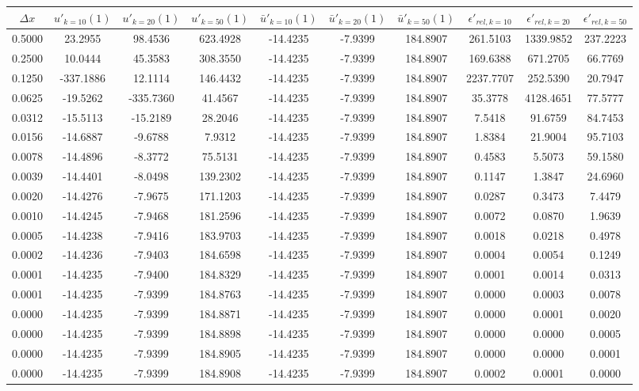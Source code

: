 \begin{tabular}{|c|c|c|c|c|c|c|c|c|c|}
\hline
\textbf{$\Delta x$}&\textbf{$u'_{k=10}(1)$}&\textbf{$u'_{k=20}(1)$}&\textbf{$u'_{k=50}(1)$}&\textbf{$\bar{u}'_{k=10}(1)$}&\textbf{$\bar{u}'_{k=20}(1)$}&\textbf{$\bar{u}'_{k=50}(1)$}&\textbf{$\epsilon'_{rel,k=10}$}&\textbf{$\epsilon'_{rel,k=20}$}&\textbf{$\epsilon'_{rel,k=50}$}\\\hline
0.5000&23.2955&98.4536&623.4928&-14.4235&-7.9399&184.8907&261.5103&1339.9852&237.2223\\\hline
0.2500&10.0444&45.3583&308.3550&-14.4235&-7.9399&184.8907&169.6388&671.2705&66.7769\\\hline
0.1250&-337.1886&12.1114&146.4432&-14.4235&-7.9399&184.8907&2237.7707&252.5390&20.7947\\\hline
0.0625&-19.5262&-335.7360&41.4567&-14.4235&-7.9399&184.8907&35.3778&4128.4651&77.5777\\\hline
0.0312&-15.5113&-15.2189&28.2046&-14.4235&-7.9399&184.8907&7.5418&91.6759&84.7453\\\hline
0.0156&-14.6887&-9.6788&7.9312&-14.4235&-7.9399&184.8907&1.8384&21.9004&95.7103\\\hline
0.0078&-14.4896&-8.3772&75.5131&-14.4235&-7.9399&184.8907&0.4583&5.5073&59.1580\\\hline
0.0039&-14.4401&-8.0498&139.2302&-14.4235&-7.9399&184.8907&0.1147&1.3847&24.6960\\\hline
0.0020&-14.4276&-7.9675&171.1203&-14.4235&-7.9399&184.8907&0.0287&0.3473&7.4479\\\hline
0.0010&-14.4245&-7.9468&181.2596&-14.4235&-7.9399&184.8907&0.0072&0.0870&1.9639\\\hline
0.0005&-14.4238&-7.9416&183.9703&-14.4235&-7.9399&184.8907&0.0018&0.0218&0.4978\\\hline
0.0002&-14.4236&-7.9403&184.6598&-14.4235&-7.9399&184.8907&0.0004&0.0054&0.1249\\\hline
0.0001&-14.4235&-7.9400&184.8329&-14.4235&-7.9399&184.8907&0.0001&0.0014&0.0313\\\hline
0.0001&-14.4235&-7.9399&184.8763&-14.4235&-7.9399&184.8907&0.0000&0.0003&0.0078\\\hline
0.0000&-14.4235&-7.9399&184.8871&-14.4235&-7.9399&184.8907&0.0000&0.0001&0.0020\\\hline
0.0000&-14.4235&-7.9399&184.8898&-14.4235&-7.9399&184.8907&0.0000&0.0000&0.0005\\\hline
0.0000&-14.4235&-7.9399&184.8905&-14.4235&-7.9399&184.8907&0.0000&0.0000&0.0001\\\hline
0.0000&-14.4235&-7.9399&184.8908&-14.4235&-7.9399&184.8907&0.0002&0.0001&0.0000\\\hline
\end{tabular}
